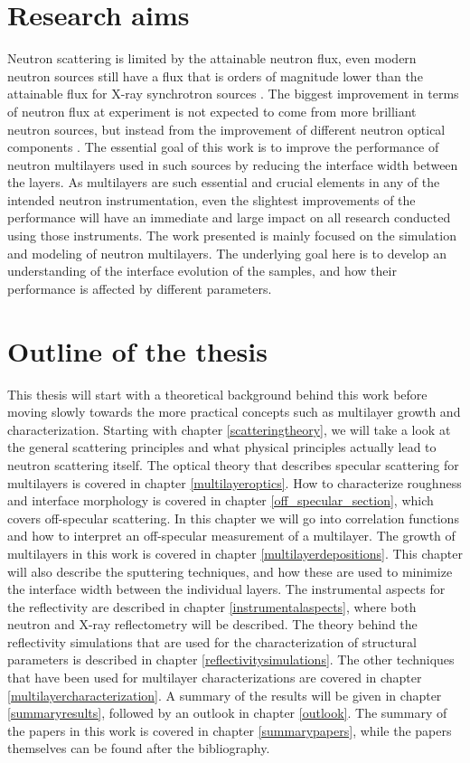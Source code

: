 \section{Research aims}
Neutron scattering is limited by the attainable neutron flux, even modern neutron sources still have a flux that is orders of magnitude lower than the attainable flux for X-ray synchrotron sources \cite{neutron_flux}. The biggest improvement in terms of neutron flux at experiment is not expected to come from more brilliant neutron sources, but instead from the improvement of different neutron optical components \cite{improvement}. The essential goal of this work is to improve the performance of neutron multilayers used in such sources by reducing the interface width between the layers.  As multilayers are such essential and crucial elements in any of the intended neutron instrumentation, even the slightest improvements of the performance will have an immediate and large impact on all research conducted using those instruments. The work presented is mainly focused on the simulation and modeling of neutron multilayers. The underlying goal here is to develop an understanding of the interface evolution of the samples, and how their performance is affected by different parameters. 
\section{Outline of the thesis}
This thesis will start with a theoretical background behind this work before moving slowly towards the more practical concepts such as multilayer growth and characterization. Starting with chapter \ref{scatteringtheory}, we will take a look at the general scattering principles and what physical principles actually lead to neutron scattering itself. The optical theory that describes specular scattering for multilayers is covered in chapter \ref{multilayeroptics}. How to characterize roughness and interface morphology is covered in chapter \ref{off_specular_section}, which covers off-specular scattering. In this chapter we will go into correlation functions and how to interpret an off-specular measurement of a multilayer. The growth of multilayers in this work is covered in chapter \ref{multilayerdepositions}. This chapter will also describe the sputtering techniques, and how these are used to minimize the interface width between the individual layers. The instrumental aspects for the reflectivity are described in chapter \ref{instrumentalaspects}, where both neutron and X-ray reflectometry will be described. The theory behind the reflectivity simulations that are used for the characterization of structural parameters is described in chapter \ref{reflectivitysimulations}. The other techniques that have been used for multilayer characterizations are covered in chapter \ref{multilayercharacterization}. A summary of the results will be given in chapter \ref{summaryresults}, followed by an outlook in chapter \ref{outlook}. The summary of the papers in this work is covered in chapter \ref{summarypapers}, while the papers themselves can be found after the bibliography.